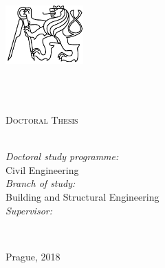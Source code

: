 \documentclass[
11pt, %
english, %
singlespacing, %
headsepline, %
]{MastersDoctoralThesis} %
\begin{document}
\begin{titlepage}
\begin{center}

\includegraphics[width=30mm]{figures/logo-cvut} \\
{\scshape\LARGE \univname\par} %
\HRule \\[0.2cm] %
\facname\\[0.2cm] %
\deptname %
\vspace{3.5cm}

{\huge \bfseries \ttitle\par}\vspace{1.0cm} %

\textsc{\Large Doctoral Thesis}\\[1.5cm] %
 
{\large \authorname}\\[3.0cm] %


\begin{minipage}[t]{\textwidth}
\begin{flushleft}
\emph{Doctoral study programme:} \\
Civil Engineering \\[0.5cm] %
\emph{Branch of study:} \\
Building and Structural Engineering \\[0.5cm] %

\emph{Supervisor:} \\
\supname %
\end{flushleft}
\end{minipage}\\[3cm]

\vfill

{\large Prague, 2018}\\[2cm] %
 
\vfill
\end{center}
\end{titlepage}

\end{document}
